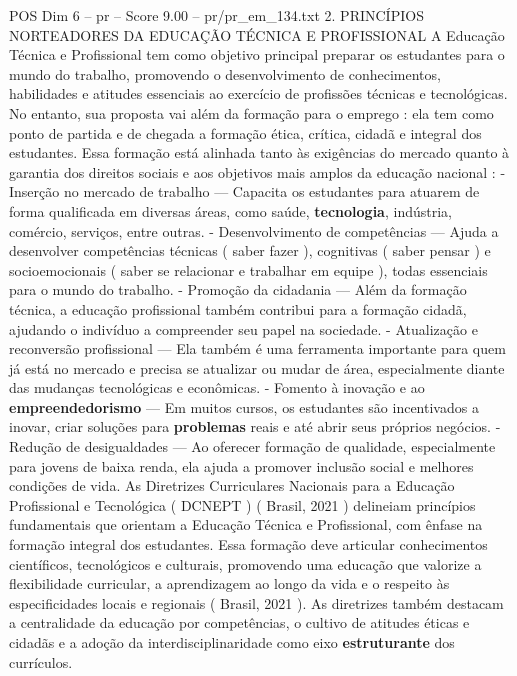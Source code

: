 \begin{textsample}{POS Dim 6 – pr – Score 9.00 – pr/pr\_em\_134.txt}  \label{ex:f6_pos_027}
2.
PRINCÍPIOS NORTEADORES DA EDUCAÇÃO TÉCNICA E PROFISSIONAL A Educação Técnica e Profissional tem como objetivo principal preparar os estudantes para o mundo do trabalho, promovendo o desenvolvimento de conhecimentos, habilidades e atitudes essenciais ao exercício de profissões técnicas e tecnológicas.
No entanto, sua proposta vai além da formação para o emprego : ela tem como ponto de partida e de chegada a formação ética, crítica, cidadã e integral dos estudantes.
Essa formação está alinhada tanto às exigências do mercado quanto à garantia dos direitos sociais e aos objetivos mais amplos da educação nacional : - Inserção no mercado de trabalho — Capacita os estudantes para atuarem de forma qualificada em diversas áreas, como saúde, \textbf{tecnologia}, indústria, comércio, serviços, entre outras. - Desenvolvimento de competências — Ajuda a desenvolver competências técnicas ( saber fazer ), cognitivas ( saber pensar ) e socioemocionais ( saber se relacionar e trabalhar em equipe ), todas essenciais para o mundo do trabalho. - Promoção da cidadania — Além da formação técnica, a educação profissional também contribui para a formação cidadã, ajudando o indivíduo a compreender seu papel na sociedade. - Atualização e reconversão profissional — Ela também é uma ferramenta importante para quem já está no mercado e precisa se atualizar ou mudar de área, especialmente diante das mudanças tecnológicas e econômicas. - Fomento à inovação e ao \textbf{empreendedorismo} — Em muitos cursos, os estudantes são incentivados a inovar, criar soluções para \textbf{problemas} reais e até abrir seus próprios negócios. - Redução de desigualdades — Ao oferecer formação de qualidade, especialmente para jovens de baixa renda, ela ajuda a promover inclusão social e melhores condições de vida.
As Diretrizes Curriculares Nacionais para a Educação Profissional e Tecnológica ( DCNEPT ) ( Brasil, 2021 ) delineiam princípios fundamentais que orientam a Educação Técnica e Profissional, com ênfase na formação integral dos estudantes.
Essa formação deve articular conhecimentos científicos, tecnológicos e culturais, promovendo uma educação que valorize a flexibilidade curricular, a aprendizagem ao longo da vida e o respeito às especificidades locais e regionais ( Brasil, 2021 ).
As diretrizes também destacam a centralidade da educação por competências, o cultivo de atitudes éticas e cidadãs e a adoção da interdisciplinaridade como eixo \textbf{estruturante} dos currículos.

\end{textsample}

